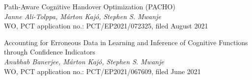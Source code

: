 			\begin{patent}
				Path-Aware Cognitive Handover Optimization (PACHO) \\
				\textit{Janne Ali-Tolppa, Márton Kajó, Stephen S. Mwanje} \\
				WO, PCT application no.: PCT/EP2021/072325, filed August 2021
			\end{patent}
			
			\begin{patent}
				Accounting for Erroneous Data in Learning and Inference of Cognitive Functions through Confidence Indicators \\
				\textit{Anubhab Banerjee, Márton Kajó, Stephen S. Mwanje} \\
				WO, PCT application no.: PCT/EP2021/067609, filed June 2021
			\end{patent}
		


